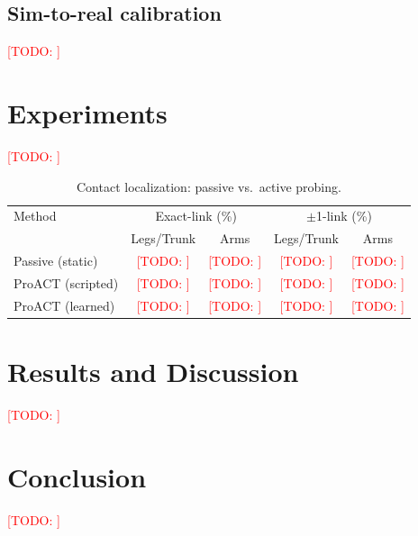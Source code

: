 \documentclass[conference]{IEEEtran}
\newcommand{\todo}[1]{\textcolor{red}{[TODO: #1]}}
\begin{document}
\subsection{Sim-to-real calibration}
\todo{}

\section{Experiments}
\todo{}

\begin{table}[t]
\centering
\caption{Contact localization: passive vs.\ active probing.}
\label{tab:main}
\begin{tabular}{lcccc}
\toprule
Method & \multicolumn{2}{c}{Exact-link (\%)} & \multicolumn{2}{c}{$\pm$1-link (\%)} \\
       & Legs/Trunk & Arms & Legs/Trunk & Arms \\
\midrule
Passive (static)      & \todo{} & \todo{} & \todo{} & \todo{} \\
ProACT (scripted)     & \todo{} & \todo{} & \todo{} & \todo{} \\
ProACT (learned)      & \todo{} & \todo{} & \todo{} & \todo{} \\
\bottomrule
\end{tabular}
\end{table}

\section{Results and Discussion}
\todo{}

\section{Conclusion}
\todo{}




\end{document}
